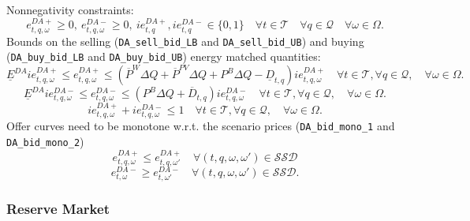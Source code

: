 Nonnegativity constraints:
\begin{equation} \label{EQ:DAVarDef2}
	e^{DA+}_{t,q, \omega} \geq 0, \ e^{DA-}_{t,q, \omega} \geq 0, \ ie^{DA+}_{t,q}, ie^{DA-}_{t,q} \in \{0, 1 \} \quad \forall t \in \mathcal{T} \quad \forall q \in \mathcal{Q} \quad \forall \omega \in \Omega.
\end{equation}
Bounds on the selling (\verb|DA_sell_bid_LB| and \verb|DA_sell_bid_UB|) and buying (\verb|DA_buy_bid_LB| and \verb|DA_buy_bid_UB|) energy matched quantities:
\begin{equation} \label{EQ:DA_sell_bid_LB2}
    \underline{E}^{DA} ie^{DA+}_{t,q, \omega} \leq e^{DA+}_{t,q, \omega} \leq (\overline{P}^W \Delta Q + \overline{P}^{PV} \Delta Q + P^B \Delta Q - \underline{D}_{t,q}) ie^{DA+}_{t,q, \omega}  \quad \forall t \in \mathcal{T}, \forall q \in \mathcal{Q}, \quad \forall \omega \in \Omega.
\end{equation}
\begin{equation} \label{EQ:DA_buy_bid_LB2}
	\underline{E}^{DA} ie^{DA-}_{t,q, \omega} \leq e^{DA-}_{t,q, \omega} \leq (P^B \Delta Q + \overline{D}_{t,q}) ie^{DA-}_{t,q, \omega} \quad \forall t \in \mathcal{T}, \forall q \in \mathcal{Q},\quad \forall \omega \in \Omega.
\end{equation}
\begin{equation} \label{EQ:DA_buy_or_sell2}
	ie^{DA+}_{t,q, \omega} + ie^{DA-}_{t,q, \omega} \leq 1 \quad \forall t \in \mathcal{T}, \forall q \in \mathcal{Q},\quad \forall \omega \in \Omega.
\end{equation}
Offer curves need to  be monotone w.r.t. the scenario prices (\verb|DA_bid_mono_1| and \verb|DA_bid_mono_2|)
\begin{equation} \label{EQ:DA_bid_mono_12}
	e^{DA+}_{t,q, \omega} \leq e^{DA+}_{t,q, \omega'} \quad \forall (t,q, \omega, \omega') \in \mathcal{SSD}
\end{equation}
\begin{equation} \label{EQ:DA_bid_mono_22}
	e^{DA-}_{t, \omega} \geq e^{DA-}_{t, \omega'} \quad \forall (t,q, \omega, \omega') \in \mathcal{SSD}.
\end{equation}

\subsubsection{Reserve Market}

